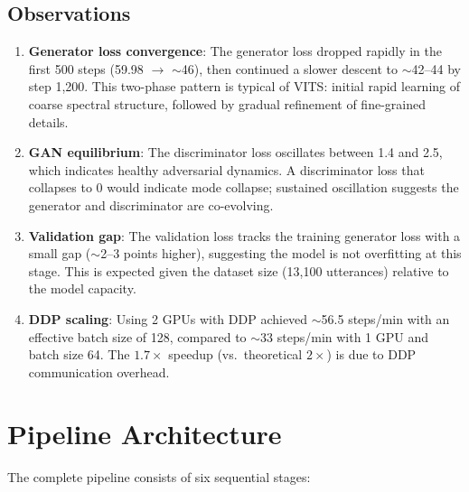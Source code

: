 \documentclass[10pt,a4paper,twocolumn]{article}
\begin{document}
\subsection{Observations}

\begin{enumerate}
    \item \textbf{Generator loss convergence}: The generator loss dropped rapidly in the first 500 steps (59.98 $\to$ $\sim$46), then continued a slower descent to $\sim$42--44 by step 1,200. This two-phase pattern is typical of VITS: initial rapid learning of coarse spectral structure, followed by gradual refinement of fine-grained details.

    \item \textbf{GAN equilibrium}: The discriminator loss oscillates between 1.4 and 2.5, which indicates healthy adversarial dynamics. A discriminator loss that collapses to 0 would indicate mode collapse; sustained oscillation suggests the generator and discriminator are co-evolving.

    \item \textbf{Validation gap}: The validation loss tracks the training generator loss with a small gap ($\sim$2--3 points higher), suggesting the model is not overfitting at this stage. This is expected given the dataset size (13,100 utterances) relative to the model capacity.

    \item \textbf{DDP scaling}: Using 2 GPUs with DDP achieved $\sim$56.5 steps/min with an effective batch size of 128, compared to $\sim$33 steps/min with 1 GPU and batch size 64. The $1.7\times$ speedup (vs.\ theoretical $2\times$) is due to DDP communication overhead.
\end{enumerate}

\section{Pipeline Architecture}
\label{sec:pipeline}

The complete pipeline consists of six sequential stages:
\end{document}

